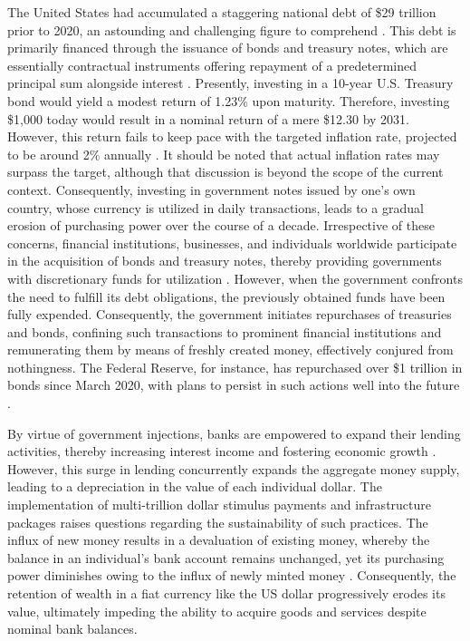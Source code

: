 The United States had accumulated a staggering national debt of \$29 trillion prior to 2020, an astounding and challenging figure to comprehend
\cite{usdebt}. This debt is primarily financed through the issuance of bonds and treasury notes, which are essentially contractual instruments
offering repayment of a predetermined principal sum alongside interest \cite{treasurysecurities}. Presently, investing in a 10-year U.S.
Treasury bond would yield a modest return of 1.23\% upon maturity. Therefore, investing \$1,000 today would result in a nominal return of a
mere \$12.30 by 2031. However, this return fails to keep pace with the targeted inflation rate, projected to be around 2\% annually
\cite{frbinflation}. It should be noted that actual inflation rates may surpass the target, although that discussion is beyond the scope of the
current context. Consequently, investing in government notes issued by one's own country, whose currency is utilized in daily transactions,
leads to a gradual erosion of purchasing power over the course of a decade. Irrespective of these concerns, financial institutions, businesses,
and individuals worldwide participate in the acquisition of bonds and treasury notes, thereby providing governments with discretionary funds
for utilization \cite{treasurysecurities}. However, when the government confronts the need to fulfill its debt obligations, the previously
obtained funds have been fully expended. Consequently, the government initiates repurchases of treasuries and bonds, confining such transactions
to prominent financial institutions and remunerating them by means of freshly created money, effectively conjured from nothingness. The Federal
Reserve, for instance, has repurchased over \$1 trillion in bonds since March 2020, with plans to persist in such actions well into the future
\cite{federalreserve}.

By virtue of government injections, banks are empowered to expand their lending activities, thereby increasing interest income and fostering
economic growth \cite{federalreserve}. However, this surge in lending concurrently expands the aggregate money supply, leading to a depreciation
in the value of each individual dollar. The implementation of multi-trillion dollar stimulus payments and infrastructure packages raises questions
regarding the sustainability of such practices. The influx of new money results in a devaluation of existing money, whereby the balance in an
individual's bank account remains unchanged, yet its purchasing power diminishes owing to the influx of newly minted money
\cite{currencydevaluation}. Consequently, the retention of wealth in a fiat currency like the US dollar progressively erodes its value,
ultimately impeding the ability to acquire goods and services despite nominal bank balances.

